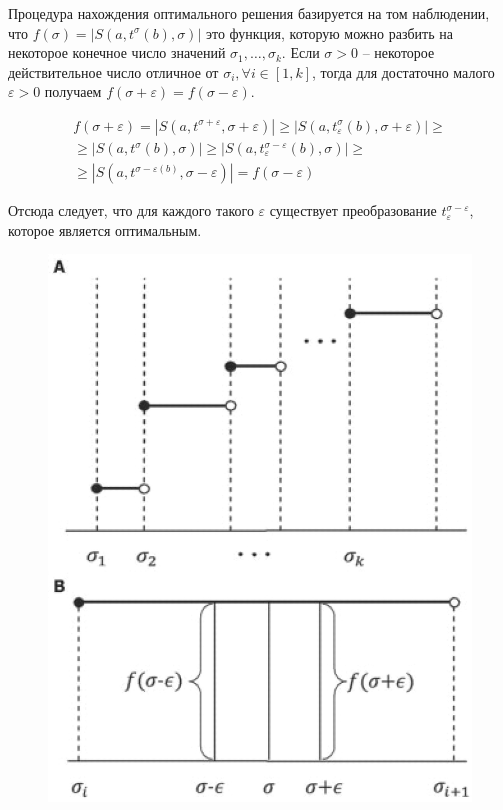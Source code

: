 \documentclass[a4paper]{extreport}
\newcommand{\eps}{\varepsilon}
\begin{document}
Процедура нахождения оптимального решения базируется на том наблюдении, что $f(\sigma) = |S(a, t^\sigma (b), \sigma)|$ это функция, которую можно разбить на некоторое конечное число значений $\sigma_1, \dots, \sigma_k$. Если $\sigma > 0$ -- некоторое действительное число отличное от $\sigma_i, \forall i \in [1, k]$, тогда для достаточно малого $\eps > 0$ получаем $f(\sigma + \eps) = f(\sigma - \eps)$.    

\begin{gather*}
f(\sigma + \eps) = |S(a, t^{\sigma + \eps}, \sigma + \eps)| \geq |S(a, t_\eps^\sigma (b), \sigma + \eps)| \geq\\ \geq
|S(a, t^\sigma (b), \sigma)| \geq |S(a, t^{\sigma - \eps}_\eps (b), \sigma)| \geq \\ \geq
|S(a, t^{\sigma - \eps (b)}, \sigma - \eps)| = f(\sigma - \eps)
\end{gather*}

Отсюда следует, что для каждого такого $\eps$ существует преобразование $t_\eps^{\sigma - \eps}$, которое является оптимальным.

\begin{figure}
\caption{}
\includegraphics[scale=0.34]{../pictures/btp530f2.jpeg}
\end{figure}
\end{document}
